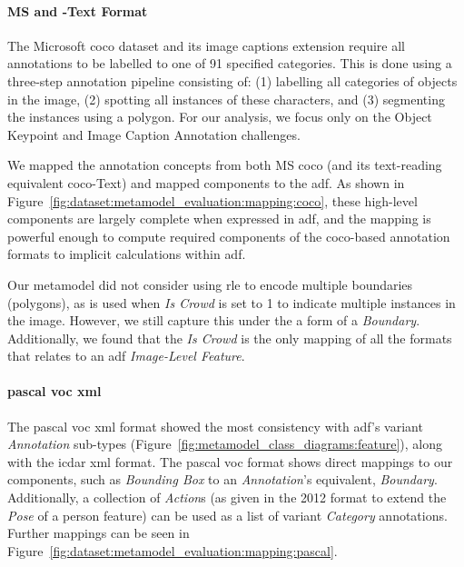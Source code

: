 \paragraph{MS  and -Text  Format}

The Microsoft \gls{coco} \citep{Lin:2014vma} dataset and its image captions extension \citep{Chen:2015ur} require all annotations to be labelled to one of 91 specified categories. This is done using a three-step annotation pipeline consisting of: (1) labelling all categories of objects in the image, (2) spotting all instances of these characters, and (3) segmenting the instances using a polygon. For our analysis, we focus only on the Object Keypoint and Image Caption Annotation challenges.

We mapped the annotation concepts from both MS \gls{coco} (and its text-reading equivalent \gls{coco}-Text) and mapped components to the \gls{adf}. As shown in Figure~\ref{fig:dataset:metamodel_evaluation:mapping:coco}, these high-level components are largely complete when expressed in \gls{adf}, and the mapping is powerful enough to compute required components of the \gls{coco}-based annotation formats to implicit calculations within \gls{adf}.

Our metamodel did not consider using \gls{rle} to encode multiple boundaries (polygons), as is used when \textit{Is Crowd} is set to 1 to indicate multiple instances in the image. However, we still capture this under the a form of a \textit{Boundary}. Additionally, we found that the \textit{Is Crowd} is the only mapping of all the formats that relates to an \gls{adf} \textit{Image-Level Feature}.


\paragraph{\gls{pascal} \gls{voc} \gls{xml}}

The \gls{pascal} \gls{voc} \gls{xml} format showed the most consistency with \gls{adf}'s variant \textit{Annotation} sub-types (Figure~\ref{fig:metamodel_class_diagrams:feature}), along with the \gls{icdar} \gls{xml} format. The \gls{pascal} \gls{voc} format shows direct mappings to our components, such as \textit{Bounding Box} to an \textit{Annotation}'s equivalent, \textit{Boundary}. Additionally, a collection of \textit{Action}s (as given in the 2012 format to extend the \textit{Pose} of a person feature) can be used as a list of variant \textit{Category} annotations. Further mappings can be seen in Figure~\ref{fig:dataset:metamodel_evaluation:mapping:pascal}.

